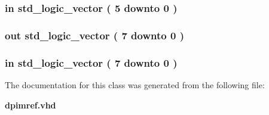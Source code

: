 \subsubsection[{rg\-Btn}]{ {\bfseries \textcolor{vhdlkeyword}{in}\textcolor{vhdlchar}{ }} {\bfseries \textcolor{comment}{std\-\_\-logic\-\_\-vector}\textcolor{vhdlchar}{ }\textcolor{vhdlchar}{(}\textcolor{vhdlchar}{ }\textcolor{vhdlchar}{ } \textcolor{vhdldigit}{5} \textcolor{vhdlchar}{ }\textcolor{vhdlchar}{ }\textcolor{vhdlchar}{ }\textcolor{vhdlkeyword}{downto}\textcolor{vhdlchar}{ }\textcolor{vhdlchar}{ }\textcolor{vhdlchar}{ } \textcolor{vhdldigit}{0} \textcolor{vhdlchar}{ }\textcolor{vhdlchar}{)}\textcolor{vhdlchar}{ }} \hspace{0.3cm}{\ttfamily [Port]}}\label{classdpimref_a9dfc3d55ccf1479fee47f4ae2ba2340b}
\subsubsection[{rg\-Led}]{ {\bfseries \textcolor{vhdlkeyword}{out}\textcolor{vhdlchar}{ }} {\bfseries \textcolor{comment}{std\-\_\-logic\-\_\-vector}\textcolor{vhdlchar}{ }\textcolor{vhdlchar}{(}\textcolor{vhdlchar}{ }\textcolor{vhdlchar}{ } \textcolor{vhdldigit}{7} \textcolor{vhdlchar}{ }\textcolor{vhdlchar}{ }\textcolor{vhdlchar}{ }\textcolor{vhdlkeyword}{downto}\textcolor{vhdlchar}{ }\textcolor{vhdlchar}{ }\textcolor{vhdlchar}{ } \textcolor{vhdldigit}{0} \textcolor{vhdlchar}{ }\textcolor{vhdlchar}{)}\textcolor{vhdlchar}{ }} \hspace{0.3cm}{\ttfamily [Port]}}\label{classdpimref_a50804d6a2d59ea5e583c9a78d17f8bf4}
\subsubsection[{rg\-Swt}]{ {\bfseries \textcolor{vhdlkeyword}{in}\textcolor{vhdlchar}{ }} {\bfseries \textcolor{comment}{std\-\_\-logic\-\_\-vector}\textcolor{vhdlchar}{ }\textcolor{vhdlchar}{(}\textcolor{vhdlchar}{ }\textcolor{vhdlchar}{ } \textcolor{vhdldigit}{7} \textcolor{vhdlchar}{ }\textcolor{vhdlchar}{ }\textcolor{vhdlchar}{ }\textcolor{vhdlkeyword}{downto}\textcolor{vhdlchar}{ }\textcolor{vhdlchar}{ }\textcolor{vhdlchar}{ } \textcolor{vhdldigit}{0} \textcolor{vhdlchar}{ }\textcolor{vhdlchar}{)}\textcolor{vhdlchar}{ }} \hspace{0.3cm}{\ttfamily [Port]}}\label{classdpimref_a77d4774aec1a84021bd48e8edfb11f9f}


The documentation for this class was generated from the following file\-:\begin{DoxyCompactItemize}
\item 
{\bf dpimref.\-vhd}\end{DoxyCompactItemize}
